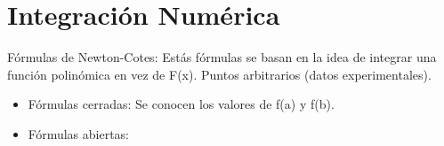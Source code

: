 \chapter{Integraci\'on Num\'erica}
F\'ormulas de Newton-Cotes: Est\'as f\'ormulas se basan en la idea de integrar una funci\'on polin\'omica en vez de F(x). Puntos arbitrarios (datos experimentales).\\
\begin{itemize}
\item F\'ormulas cerradas: Se conocen los valores de f(a) y f(b).
\item F\'ormulas abiertas:
\end{itemize}

